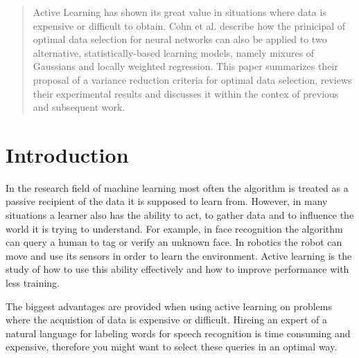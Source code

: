 \documentclass{article}
\begin{document}


\begin{abstract}
Active Learning has shown its great value in situations where data is expensive
or difficult to obtain. Cohn et al.  describe how the prinicipal of
optimal data selection for neural networks can also be applied to two
alternative, statistically-based learning models, namely mixures of Gaussians
and locally weighted regression. This paper summarizes their proposal of a variance
reduction criteria for optimal data selection, reviews their experimental results
and discusses it within the contex of previous and subsequent work.
\end{abstract}

\section{Introduction}
In the research field of machine learning most often the algorithm is treated as a passive
recipient of the data it is supposed to learn from. However, in many situations
a learner also has the ability to act, to gather data and to influence
the world it is trying to understand. For example, in face recognition the
algorithm can query a human to tag or verify an unknown face. In robotics the
robot can move and use its sensors in order to learn the environment. Active
learning is the study of how to use this ability effectively and how to improve
performance with less training.

The biggest advantages are provided when using active learning on problems where
the acquistion of data is expensive or difficult. Hireing an expert of a
natural language for labeling words for speech recognition is time consuming
and expensive, therefore you might want to select these queries in an optimal way.
\end{document}
